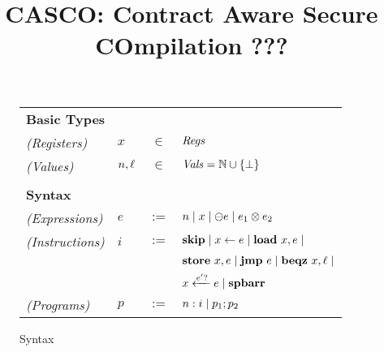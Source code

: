 \documentclass[conference]{IEEEtran}
\begin{document}

\title{\huge{CASCO: Contract Aware Secure COmpilation ???}}

\newcommand{\firstauthormark}{$^*$}

\author{
\and
{}
\and
{}
}

\maketitle


% 
% 

\begin{figure}
\begin{tabular}{llcl}
\multicolumn{4}{l}{\bf Basic Types} \\
\textit{(Registers)} 	&  $x$		& $\in$ & $\Var$ \\
\textit{(Values)} 		&  $n, \lbl$ 		& $\in$ & $\Val = \Nat \cup \{\bot\}$ \\\\
\multicolumn{4}{l}{\bf Syntax} \\
\textit{(Expressions)} 	&  $e$		& $:=$ & $n \mid x \mid \unaryOp{e} \mid \binaryOp{e_1}{e_2}$ \\
\textit{(Instructions)} 	&  $i$ 		& $:=$ & $\pskip{} \mid \passign{x}{e} \mid \pload{x}{e} \mid $ \\
						&			&	   & $\pstore{x}{e} \mid \pjmp{e} \mid \pjz{x}{\lbl} \mid$ \\
						&			&	   & $ \pcondassign{x}{e}{e'} \mid \pbarrier{}$ \\
\textit{(Programs)}		&  $p$		& $:=$ & $\cmd{n}{i} \mid \pseq{p_1}{p_2}$
\end{tabular}
\caption{\lang{} Syntax}\label{figure:language:syntax}
\end{figure}
\end{document}
